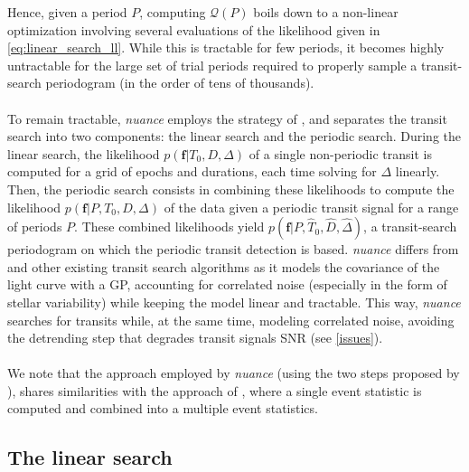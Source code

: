 \documentclass[modern]{aastex631}
\newcommand{\nuancemethod}{\textit{nuance}}
\begin{document}
Hence, given a period $P$, computing $\mathcal{Q}(P)$ boils down to a non-linear optimization involving several evaluations of the likelihood given in \autoref{eq:linear_search_ll}. While this is tractable for few periods, it becomes highly untractable for the large set of trial periods required to properly sample a transit-search periodogram (in the order of tens of thousands).\\\\
To remain tractable, \nuancemethod{} employs the strategy of \cite{foreman2016}, and separates the transit search into two components: the linear search and the periodic search. During the linear search, the likelihood $p(\bm{f} \vert T_0, D, \Delta)$ of a single non-periodic transit is computed for a grid of epochs and durations, each time solving for $\Delta$ linearly. Then, the periodic search consists in combining these likelihoods to compute the likelihood $p(\bm{f} \vert P, T_0, D, \Delta)$ of the data given a periodic transit signal for a range of periods $P$. These combined likelihoods yield $p(\bm{f} \vert P, \hat T_0 ,\hat D, \hat \Delta)$, a transit-search periodogram on which the periodic transit detection is based. \nuancemethod{} differs from \cite{foreman2016} and other existing transit search algorithms as it models the covariance of the light curve with a GP, accounting for correlated noise (especially in the form of stellar variability) while keeping the model linear and tractable. This way, \nuancemethod{} searches for transits while, at the same time, modeling correlated noise, avoiding the detrending step that degrades transit signals SNR (see \autoref{issues}).\\\\
We note that the approach employed by \nuancemethod{} (using the two steps proposed by \citealt{foreman2016}), shares similarities with the approach of \cite{Jenkins2010}, where a single event statistic is computed and combined into a multiple event statistics.

\subsection{The linear search}\label{linear_search}
\end{document}

